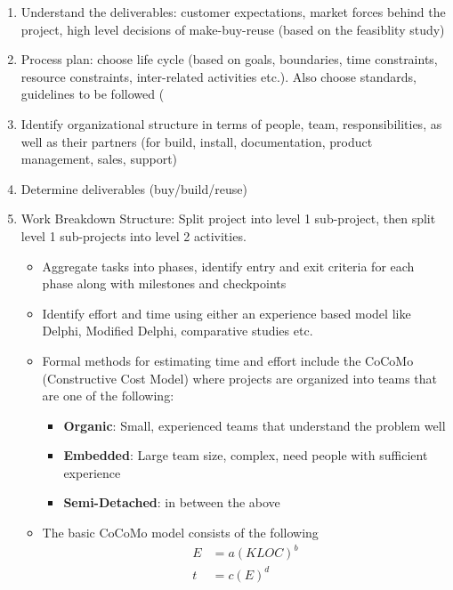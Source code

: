 \documentclass{article}
\begin{document}
\begin{enumerate}
    \item Understand the deliverables: customer expectations, market forces behind the project, high level decisions of make-buy-reuse (based on the feasiblity study)
    
    \item Process plan: choose life cycle (based on goals, boundaries, time constraints, resource constraints, inter-related activities etc.). Also choose standards, guidelines to be followed (
    
    \item Identify organizational structure in terms of people, team, responsibilities, as well as their partners (for build, install, documentation, product management, sales, support)
    
    \item Determine deliverables (buy/build/reuse)
    
    \item Work Breakdown Structure: Split project into level 1 sub-project, then split level 1 sub-projects into level 2 activities.
    \begin{itemize}
        \item Aggregate tasks into phases, identify entry and exit criteria for each phase along with milestones and checkpoints
        
        \item Identify effort and time using either an experience based model like Delphi, Modified Delphi, comparative studies etc.
        
        \item Formal methods for estimating time and effort include the CoCoMo (Constructive Cost Model) where projects are organized into teams that are one of the following:
        \begin{itemize}
            \item \textbf{Organic}: Small, experienced teams that understand the problem well
            
            \item \textbf{Embedded}: Large team size, complex, need people with sufficient experience
            
            \item \textbf{Semi-Detached}: in between the above 
        \end{itemize}
        
        \item The basic CoCoMo model consists of the following
        \begin{align*}
            E &= a (KLOC)^b \\
            t &= c (E)^d 
        \end{align*}
        

\end{itemize}
\end{enumerate}
\end{document}
